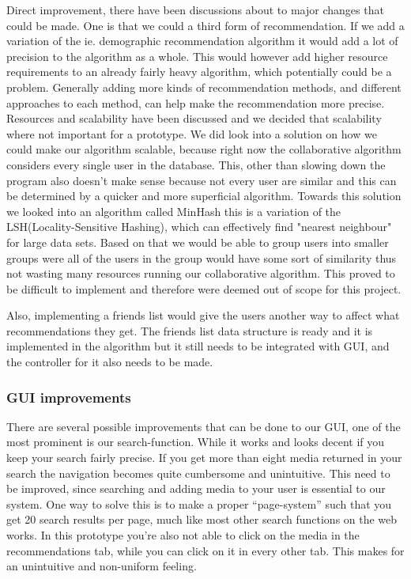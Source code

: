 Direct improvement, there have been discussions about to major changes that could be made. One is that we could a third form of recommendation. If we add a variation of the ie. demographic recommendation algorithm it would add a lot of precision to the algorithm as a whole. This would however add higher resource requirements to an already fairly heavy algorithm, which potentially could be a problem. Generally adding more kinds of recommendation methods, and different approaches to each method, can help make the recommendation more precise.
Resources and scalability have been discussed and we decided that scalability where not important for a prototype. We did look into a solution on how we could make our algorithm scalable, because right now the collaborative algorithm considers every single user in the database. This, other than slowing down the program also doesn't make sense because not every user are similar and this can be determined by a quicker and more superficial algorithm. Towards this solution we looked into an algorithm called MinHash this is a variation of the LSH(Locality-Sensitive Hashing), which can effectively find "nearest neighbour" for large data sets. Based on that we would be able to group users into smaller groups were all of the users in the group would have some sort of similarity thus not wasting many resources running our collaborative algorithm. This proved to be difficult to implement and therefore were deemed out of scope for this project.


Also, implementing a friends list would give the users another way to affect what recommendations they get. The friends list data structure is ready and it is implemented in the algorithm but it still needs to be integrated with GUI, and the controller for it also needs to be made.

\subsubsection{GUI improvements}
There are several possible improvements that can be done to our GUI, one of the most prominent is our search-function. While it works and looks decent if you keep your search fairly precise. If you get more than eight media returned in your search the navigation becomes quite cumbersome and unintuitive. This need to be improved, since searching and adding media to your user is essential to our system. One way to solve this is to make a proper “page-system” such that you get 20 search results per page, much like most other search functions on the web works.
In this prototype you’re also not able to click on the media in the recommendations tab, while you can click on it in every other tab. This makes for an unintuitive and non-uniform feeling.

